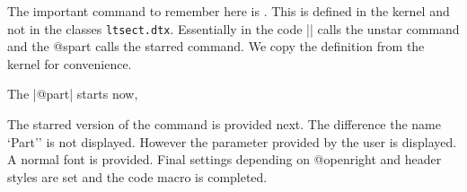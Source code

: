  The important command to remember here
is . This is defined in the kernel and not in the classes \texttt{ltsect.dtx}. Essentially in the code |\@part| calls the unstar command and the @spart calls the starred command. We copy the definition from the kernel for convenience.



The |@part| starts now,

\begin{teX}
\def\@part[#1]#2{%
    \ifnum \c@secnumdepth >-2\relax
      \refstepcounter{part}%
      \addcontentsline{toc}{part}{\thepart\hspace{1em}#1}%
    \else
      \addcontentsline{toc}{part}{#1}%
    \fi
    \markboth{}{}%
    {\centering
     \interlinepenalty \@M
     \normalfont
     \ifnum \c@secnumdepth >-2\relax
       \huge\bfseries \partname\nobreakspace\thepart
       \par
       \vskip 20\p@
     \fi
     \Huge \bfseries #2\par}%
    \@endpart}
\end{teX}

\begin{multicols}{2}
The starred version of the command is provided next. The difference the name `Part'' is not displayed. However the parameter provided by the user is displayed. A normal font is provided. Final settings depending on @openright and header styles are set and the code macro is completed.
\end{multicols}

